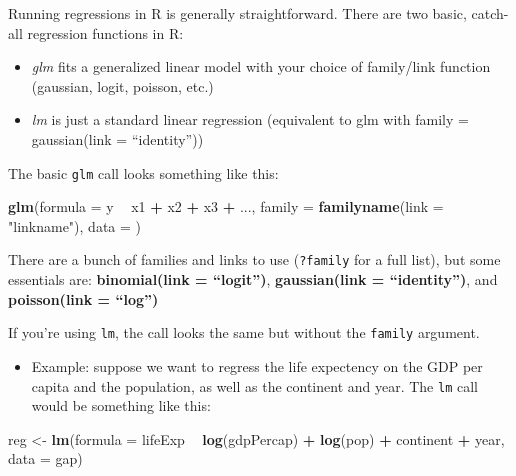 \documentclass[]{book}
\newenvironment{Shaded}{\begin{snugshade}}{\end{snugshade}}
\newcommand{\KeywordTok}[1]{\textcolor[rgb]{0.13,0.29,0.53}{\textbf{#1}}}
\newcommand{\DataTypeTok}[1]{\textcolor[rgb]{0.13,0.29,0.53}{#1}}
\newcommand{\StringTok}[1]{\textcolor[rgb]{0.31,0.60,0.02}{#1}}
\newcommand{\OperatorTok}[1]{\textcolor[rgb]{0.81,0.36,0.00}{\textbf{#1}}}
\newcommand{\NormalTok}[1]{#1}
\providecommand{\tightlist}{%
  \setlength{\itemsep}{0pt}\setlength{\parskip}{0pt}}
\begin{document}
Running regressions in R is generally straightforward. There are two
basic, catch-all regression functions in R:

\begin{itemize}
\item
  \emph{glm} fits a generalized linear model with your choice of
  family/link function (gaussian, logit, poisson, etc.)
\item
  \emph{lm} is just a standard linear regression (equivalent to glm with
  family = gaussian(link = ``identity''))
\end{itemize}

The basic \texttt{glm} call looks something like this:

\begin{Shaded}
\begin{Highlighting}[]
\KeywordTok{glm}\NormalTok{(}\DataTypeTok{formula =}\NormalTok{ y }\OperatorTok{~}\StringTok{ }\NormalTok{x1 }\OperatorTok{+}\StringTok{ }\NormalTok{x2 }\OperatorTok{+}\StringTok{ }\NormalTok{x3 }\OperatorTok{+}\StringTok{ }\NormalTok{..., }\DataTypeTok{family =} \KeywordTok{familyname}\NormalTok{(}\DataTypeTok{link =} \StringTok{"linkname"}\NormalTok{), }\DataTypeTok{data =}\NormalTok{ )}
\end{Highlighting}
\end{Shaded}

There are a bunch of families and links to use (\texttt{?family} for a
full list), but some essentials are: \textbf{binomial(link =
``logit'')}, \textbf{gaussian(link = ``identity'')}, and
\textbf{poisson(link = ``log'')}

If you're using \texttt{lm}, the call looks the same but without the
\texttt{family} argument.

\begin{itemize}
\tightlist
\item
  Example: suppose we want to regress the life expectency on the GDP per
  capita and the population, as well as the continent and year. The
  \texttt{lm} call would be something like this:
\end{itemize}

\begin{Shaded}
\begin{Highlighting}[]
\NormalTok{reg <-}\StringTok{ }\KeywordTok{lm}\NormalTok{(}\DataTypeTok{formula =}\NormalTok{ lifeExp }\OperatorTok{~}\StringTok{ }\KeywordTok{log}\NormalTok{(gdpPercap) }\OperatorTok{+}\StringTok{ }\KeywordTok{log}\NormalTok{(pop) }\OperatorTok{+}\StringTok{ }\NormalTok{continent }\OperatorTok{+}\StringTok{ }\NormalTok{year, }\DataTypeTok{data =}\NormalTok{ gap)}
\end{Highlighting}
\end{Shaded}
\end{document}
